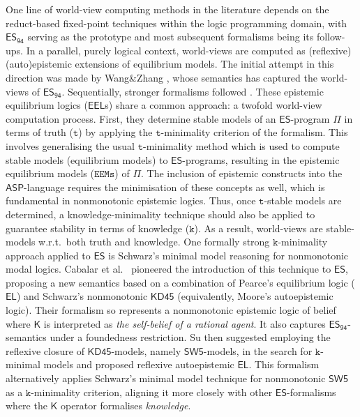 \documentclass[submission,copyright,creativecommons]{eptcs}
\newcommand{\logic}[1]  { \ensuremath{\mathsf{#1}} }
\newcommand{\KD}  { \logic{KD45} }
\newcommand{\SW}  { \logic{SW5} }
\newcommand{\ASP}  { \logic{ASP} }
\newcommand{\EL}  { \logic{EL} }
\newcommand{\ES}  { \logic{ES} }
\newcommand{\EEL}  { \logic{EEL} }
\newcommand{\epispec}  { \Pi }
\newcommand{\K}  { \mathsf{K} }
\newcommand{\ESdoksandort}  { \logic{ES_{\scriptscriptstyle{94}} } }
\newcommand{\EEMs}  { \texttt{EEMs} }
\begin{document}
One line of world-view computing methods in the literature 
depends on the reduct-based 
fixed-point techniques within the logic programming domain, 
with $\ESdoksandort$ serving
as the prototype and most subsequent formalisms being its follow-ups. 
In a parallel, purely logical context, world-views are computed as (reflexive) (auto)epistemic 
extensions of equilibrium models. The initial attempt in this direction 
was made by Wang\&Zhang \cite{WangZ05nested}, whose semantics 
has captured the world-views of $\ESdoksandort$. 
Sequentially, stronger formalisms followed \cite{SuAI20,Cabalar20,Su2021}.
These epistemic equilibrium logics ($\EEL$s) share a common approach: a twofold
world-view computation process. First, they determine stable models of an 
$\ES$-program $\epispec$ in terms of truth ($\texttt{t}$) by applying the 
$\texttt{t}$-minimality criterion of the formalism.
This involves generalising the usual $\texttt{t}$-minimality method which is used to
compute stable models (equilibrium models) 
to $\ES$-programs, resulting in the epistemic equilibrium models ($\EEMs$) 
of $\epispec$.
The inclusion of epistemic constructs into the $\ASP$-language requires the minimisation of these concepts as well, which is fundamental in nonmonotonic epistemic logics. Thus, once $\texttt{t}$-stable models are determined, a 
knowledge-minimality technique should also be applied to guarantee stability
in terms of knowledge ($\texttt{k}$). As a result, world-views are stable-models w.r.t.\ 
both truth and knowledge.
One formally strong $\texttt{k}$-minimality approach applied to $\ES$ is Schwarz's
\cite{Schwarz92} minimal model reasoning for nonmonotonic modal logics. Cabalar et al.\ \cite{Cabalar20} pioneered the introduction of this technique to $\ES$,
proposing a new semantics based on a combination of Pearce's 
equilibrium logic ($\EL$) \cite{Pearce06}
and Schwarz's nonmonotonic $\KD$ \cite{Schwarz92,SU.FI20} 
(equivalently, Moore's autoepistemic logic). Their
formalism so represents a nonmonotonic epistemic logic of belief where
$\K$ is interpreted as \emph{the self-belief of a rational agent}. 
It also captures $\ESdoksandort$-semantics under a foundedness restriction.
Su \cite{Su2021} then suggested employing 
the reflexive closure of $\KD$-models, namely $\SW$-models, 
in the search for $\texttt{k}$-minimal models and proposed reflexive autoepistemic $\EL$. This formalism alternatively applies Schwarz's minimal model technique for nonmonotonic $\SW$ as a $\texttt{k}$-minimality criterion, 
aligning it more closely with other $\ES$-formalisms where
the $\K$ operator formalises \emph{knowledge}. 
\end{document}
